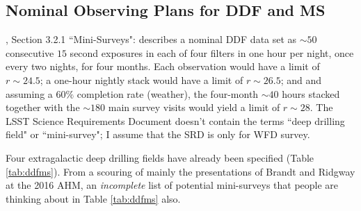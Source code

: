 \documentclass[DM,lsstdraft,toc]{lsstdoc}
\begin{document}
\subsection{Nominal Observing Plans for DDF and MS}\label{ssec:science_plans}

\cite{2008arXiv0805.2366I}, Section 3.2.1 ``Mini-Surveys": describes a nominal DDF data set as $\sim50$ consecutive $15$ second exposures in each of four filters in one hour per night, once every two nights, for four months. Each observation would have a limit of $r\sim24.5$; a one-hour nightly stack would have a limit of $r\sim26.5$; and and assuming a $60\%$ completion rate (weather), the four-month $\sim40$ hours stacked together with the $\sim180$ main survey visits would yield a limit of $r\sim28$. The LSST Science Requirements Document \cite{LPM-17} doesn't contain the terms ``deep drilling field" or ``mini-survey"; I assume that the SRD is only for WFD survey.

Four extragalactic deep drilling fields have already been specified (Table \ref{tab:ddfms}). From a scouring of mainly the presentations of Brandt and Ridgway at the 2016 AHM, an {\it incomplete} list of potential mini-surveys that people are thinking about in Table \ref{tab:ddfms} also.
\end{document}
